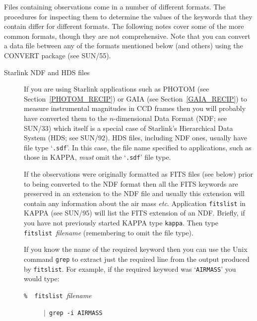 \documentclass[twoside,11pt]{article}
\newcommand{\xref}[3]{#1}
\begin{document}
Files containing observations come in a number of different formats.
The procedures for inspecting them to determine the values of the
keywords that they contain differ for different formats.  The following
notes cover some of the more common formats, though they are not
comprehensive.  Note that you can convert a data file between any of
the formats mentioned below (and others) using the CONVERT package
(see \xref{SUN/55}{sun55}{}\cite{SUN55}).

\begin{description}

  \item[Starlink NDF and HDS files] If you are using Starlink
   applications such as PHOTOM (see Section~\ref{PHOTOM_RECIP}) or
   GAIA (see Section~\ref{GAIA_RECIP}) to measure instrumental
   magnitudes in CCD frames then you will probably have converted them
   to the $n$-dimensional Data Format (NDF; see
   \xref{SUN/33}{sun33}{}\cite{SUN33}) which itself is a special case
   of Starlink's Hierarchical Data System (HDS; see
   \xref{SUN/92}{sun92}{}\cite{SUN92}).  HDS files, including NDF
   ones, usually have file type `{\tt .sdf}'.  In this case, the file name
   specified to applications, such as those in KAPPA, {\it must\/} omit
   the `{\tt .sdf}' file type.

   If the observations were originally formatted as FITS files (see
   below) prior to being converted to the NDF format then all the
   FITS keywords are preserved in an extension to the NDF file and
   usually this extension will contain any information about the
   air mass \emph{etc}.  Application \xref{{\tt fitslist}}{sun95}{FITSLIST}
   in KAPPA (see \xref{SUN/95}{sun95}{}\cite{SUN95}) will list the FITS
   extension of an NDF.  Briefly, if you have not previously started
   KAPPA type {\tt kappa}.  Then type 
   \xref{{\tt fitslist}}{sun95}{FITSLIST}~{\it filename}
   (remembering to omit the file type).

   If you know the name of the required keyword then you can use the
   Unix command {\tt grep} to extract just the required line from the
   output produced by {\tt fitslist}.  For example, if the required keyword
   was `{\tt AIRMASS}' you would type:

  \begin{description}

    \item[{\tt \% ~fitslist}~{\it filename\/}] {\tt $|$ grep -i AIRMASS}

  \end{description}


\end{description}
\end{document}
